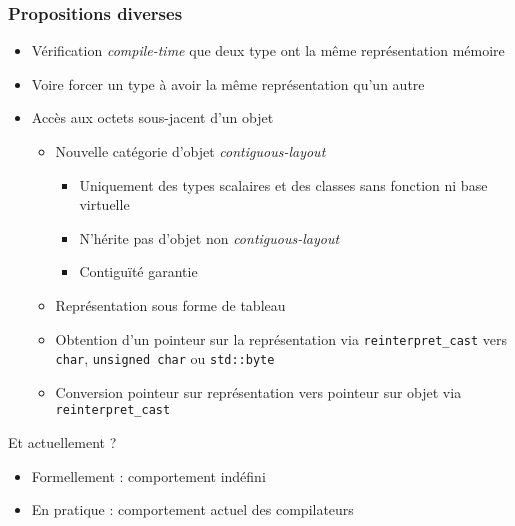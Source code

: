\documentclass[C++.tex]{subfiles}
\begin{document}
\begin{frame}[fragile]
	\frametitle{Propositions diverses}
	\begin{itemize}
		\item Vérification \textit{compile-time} que deux type ont la même représentation mémoire


		\item Voire forcer un type à avoir la même représentation qu'un autre
		\item Accès aux octets sous-jacent d'un objet
		\begin{itemize}
			\item Nouvelle catégorie d'objet \textit{contiguous-layout}
			\begin{itemize}
				\item Uniquement des types scalaires et des classes sans fonction ni base virtuelle
				\item N'hérite pas d'objet non \textit{contiguous-layout}
				\item Contiguïté garantie
			\end{itemize}
			\item Représentation sous forme de tableau
			\item Obtention d'un pointeur sur la représentation via \lstinline|reinterpret_cast| vers \lstinline|char|, \lstinline|unsigned char| ou \lstinline|std::byte|
			\item Conversion pointeur sur représentation vers pointeur sur objet via \lstinline|reinterpret_cast|
		\end{itemize}
	\end{itemize}

	\begin{block}{Et actuellement ?}
		\begin{itemize}
			\item Formellement : comportement indéfini
			\item En pratique : comportement actuel des compilateurs 
		\end{itemize}
	\end{block}
\end{frame}
\end{document}
